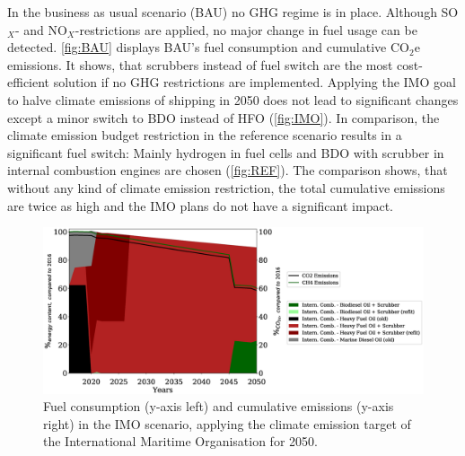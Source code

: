 \documentclass[article]{elsarticle}
\begin{document}


In the business as usual scenario (BAU) no GHG regime is in place. Although SO$_X$- and NO$_X$-restrictions are applied, no major change in fuel usage can be detected. \autoref{fig:BAU} displays BAU's fuel consumption and cumulative CO$_2$e emissions. It shows, that scrubbers instead of fuel switch are the most cost-efficient solution if no GHG restrictions are implemented. Applying the IMO goal to halve climate emissions of shipping in 2050 does not lead to significant changes except a minor switch to BDO instead of HFO (\autoref{fig:IMO}). In comparison, the climate emission budget restriction in the reference scenario  results in a significant fuel switch: Mainly hydrogen in fuel cells and BDO with scrubber in internal combustion engines are chosen (\autoref{fig:REF}). The comparison shows, that without any kind of climate emission restriction, the total cumulative emissions are twice as high and the IMO plans do not have a significant impact. 


\begin{figure}
    \centering
    \includegraphics[width=\textwidth]{figures/IMO_fuels_emissions.eps}
    \caption{Fuel consumption (y-axis left) and cumulative emissions (y-axis right) in the IMO scenario, applying the climate emission target of the International Maritime Organisation for 2050.}
    \label{fig:IMO}
\end{figure}
\end{document}
